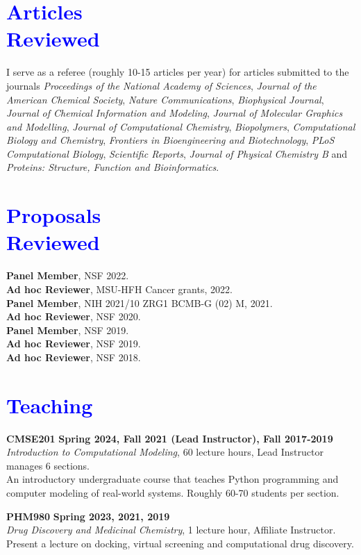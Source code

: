 \documentclass[margin,line]{res}
\begin{document}
\begin{resume}
\section{\sc \textcolor{blue}{ Articles \\ Reviewed}}
I serve as a referee (roughly 10-15 articles per year) for articles submitted to the journals \textit{Proceedings of the National Academy of Sciences}, \textit{Journal of the American Chemical Society}, \textit{Nature Communications}, \textit{Biophysical Journal}, \textit{Journal of Chemical Information and Modeling}, \textit{Journal of Molecular Graphics and Modelling}, \textit{Journal of Computational Chemistry}, \textit{Biopolymers}, \textit{Computational Biology and Chemistry}, \textit{Frontiers in Bioengineering and Biotechnology}, \textit{PLoS Computational Biology}, \textit{Scientific Reports}, \textit{Journal of Physical Chemistry B} and \textit{Proteins: Structure, Function and Bioinformatics}.

\section{\sc \textcolor{blue}{ Proposals \\ Reviewed}}
{\bf Panel Member}, NSF \hfill 2022.\\
{\bf Ad hoc Reviewer}, MSU-HFH \hfill Cancer grants, 2022. \\
{\bf Panel Member}, NIH \hfill 2021/10 ZRG1 BCMB-G (02) M, 2021. \\
{\bf Ad hoc Reviewer}, NSF \hfill 2020. \\
{\bf Panel Member}, NSF \hfill 2019.\\
{\bf Ad hoc Reviewer}, NSF \hfill 2019. \\
{\bf Ad hoc Reviewer}, NSF \hfill 2018. \\

\section{\sc \textcolor{blue}{ Teaching }}
{\bf CMSE201} \hfill {\bf Spring 2024, Fall 2021 (Lead Instructor), Fall 2017-2019} \\
\emph{Introduction to Computational Modeling}, 60 lecture hours, Lead Instructor manages 6 sections.\\
An introductory undergraduate course that teaches Python programming and computer modeling of real-world systems. Roughly 60-70 students per section.

{\bf PHM980} \hfill {\bf Spring 2023, 2021, 2019} \\
\emph{Drug Discovery and Medicinal Chemistry}, 1 lecture hour, Affiliate Instructor.\\
Present a lecture on docking, virtual screening and computational drug discovery.


\end{resume}
\end{document}
